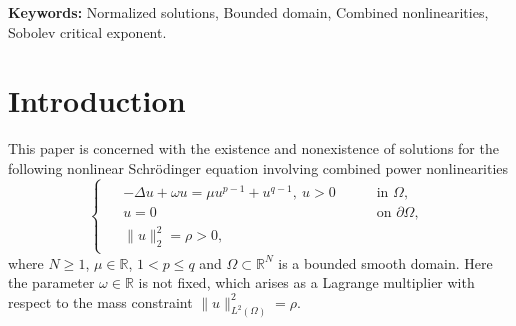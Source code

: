 \documentclass[10pt]{article}
\numberwithin{equation}{section}
\numberwithin{equation}{section}
\begin{document}
\begin{abstract}
\noindent In this paper, we consider the existence, multiplicity and nonexistence of  solutions for the following equation
\begin{equation*}
\begin{cases}
\begin{aligned}
&-\Delta u+\omega u=\mu u^{p-1}+u^{q-1},~ u>0 \quad &&\text { in } \Omega, \\
&u=0  &&\text { on } \partial\Omega, \\
\end{aligned}
\end{cases}
\end{equation*}
with prescribed $L^2$-norm $\|u\|_2^2=\rho$, where $N\ge 1$, $\rho>0$, $\mu\in \mathbb{R}$, $1<p\le q$, and $\Omega\subset\mathbb{R}^N$ is a bounded smooth domain. The parameter $\omega\in\mathbb{R}$ arises as a Lagrange multiplier. Firstly, when $2<p\le q\le \frac{2N}{(N-2)^+}$ and $\rho$ is small, we establish the existence of a local minimizer of energy. Furthermore, when $\mu\ge 0$ and $\Omega$ is a star-shaped domain, using the monotonicity trick and the Pohozaev identity, we show that there exists a second solution which is of mountain pass type. Secondly, when  $\mu\ge 0$, $N\ge 3$, $1<p\le 2$, $q\ge \max\left\{\frac{2N}{N-2}, 3\right\}$ and $\Omega$ is a convex domain, using the moving-plane method, we prove the nonexistence of normalized solutions for large $\rho$. Finally, when $\mu=0$, $N\ge 3$, $q=\frac{2N}{N-2}$ and $\Omega$ is a ball, we give a dichotomy result of normalized solutions for the Br\'{e}zis-Nirenberg problem by continuation arguments.
 \end{abstract}
\textbf{Keywords:} Normalized solutions, Bounded domain, Combined nonlinearities, Sobolev critical exponent.


\section{Introduction}\label{s1}
This paper is concerned with the existence and nonexistence of solutions for the following nonlinear Schr\"{o}dinger equation involving combined power nonlinearities \begin{equation}\label{041003}
\begin{cases}
\begin{aligned}
&-\Delta u+\omega u=\mu u^{p-1}+u^{q-1},~ u>0 \quad &&\text { in } \Omega, \\
&u=0  &&\text { on } \partial\Omega, \\
&\|u\|_2^2=\rho>0,
\end{aligned}
\end{cases}
\end{equation}
where $N\ge 1$, $\mu\in \mathbb{R}$, $1<p\le q$  and $\Omega\subset\mathbb{R}^N$ is a bounded smooth domain. Here the parameter $\omega\in\mathbb{R}$ is not fixed, which arises as a Lagrange multiplier with respect to the mass constraint $\|u\|^2_{L^2(\Omega)}=\rho$.
\end{document}
